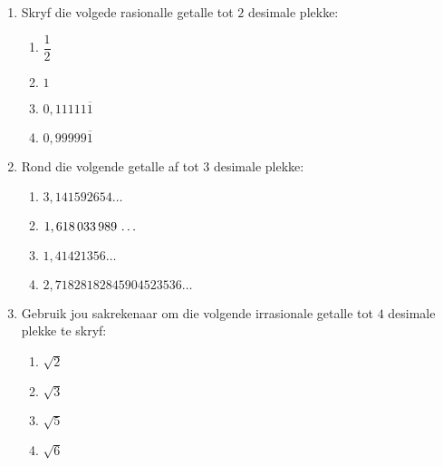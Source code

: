 \begin{eocexercises}{}
\begin{enumerate}[itemsep=5pt, label=\textbf{\arabic*}. ]


\item Skryf die volgede rasionalle getalle tot $2$ desimale plekke:
    \begin{enumerate}[itemsep=5pt, label=\textbf{\alph*}. ] 
    \item $\dfrac{1}{2}$
    \item $1$
    \item $0,11111\overline{1}$
    \item $0,99999\overline{1}$
    \end{enumerate}

\item Rond die volgende getalle af tot $3$ desimale plekke:
\begin{multicols}{2}
    \begin{enumerate}[itemsep=5pt, label=\textbf{\alph*}. ] 
    \item $3,141592654\ldots$
    \item $1,618\phantom{\rule{0.166667em}{0ex}}033\phantom{\rule{0.166667em}{0ex}}989\phantom{\rule{0.166667em}{0ex}}\ldots$
    \item $1,41421356\ldots$
    \item $2,71828182845904523536\ldots$
    \end{enumerate}
\end{multicols}
\item Gebruik jou sakrekenaar om die volgende irrasionale getalle tot $4$ desimale plekke te skryf:
\begin{multicols}{2}
    \begin{enumerate}[itemsep=5pt, label=\textbf{\alph*}. ] 
    \item $\sqrt{2}$
    \item $\sqrt{3}$
    \item $\sqrt{5}$
    \item $\sqrt{6}$
    \end{enumerate}
\end{multicols}


\end{enumerate}
\end{eocexercises}
